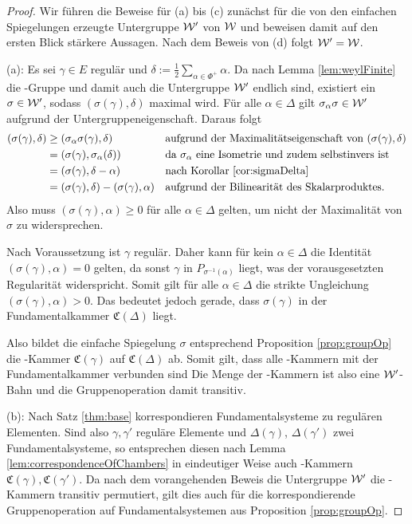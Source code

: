 \begin{proof}
  Wir führen die Beweise für (a) bis (c) zunächst für die von den einfachen Spiegelungen erzeugte Untergruppe $\mathcal{W}'$ von $\mathcal{W}$ und beweisen damit auf den ersten Blick stärkere Aussagen.
  Nach dem Beweis von (d) folgt $\mathcal{W}' = \mathcal{W}$.

  (a):
  Es sei $\gamma \in E$ regulär und $\delta := \tfrac{1}{2} \sum_{\alpha \in \Phi^+} \alpha$.
  Da nach Lemma \ref{lem:weylFinite} die \weyl\hyp{}Gruppe und damit auch die Untergruppe $\mathcal{W}'$ endlich sind, existiert ein $\sigma \in \mathcal{W}'$, sodass $(\sigma(\gamma), \delta)$ maximal wird.
  Für alle $\alpha \in \Delta$ gilt $\sigma_\alpha\sigma \in \mathcal{W}'$ aufgrund der Untergruppeneigenschaft.
  Daraus folgt
  \begin{align*}
    (\sigma(\gamma), \delta) 
    &\geq (\sigma_\alpha \sigma(\gamma), \delta) &&\text{aufgrund der Maximalitätseigenschaft von $(\sigma(\gamma),\delta)$} \\
    &= (\sigma(\gamma), \sigma_\alpha(\delta)) &&\text{da $\sigma_\alpha$ eine Isometrie und zudem selbstinvers ist} \\
    &= (\sigma(\gamma), \delta - \alpha) &&\text{nach Korollar \ref{cor:sigmaDelta}} \\
    &= (\sigma(\gamma), \delta) - (\sigma(\gamma), \alpha) &&\text{aufgrund der Bilinearität des Skalarproduktes.}
  \end{align*}
  Also muss $(\sigma(\gamma), \alpha) \geq 0$ für alle $\alpha \in \Delta$ gelten, um nicht der Maximalität von $\sigma$ zu widersprechen.

  Nach Voraussetzung ist $\gamma$ regulär.
  Daher kann für kein $\alpha \in \Delta$ die Identität $(\sigma(\gamma),\alpha) = 0$ gelten, da sonst $\gamma$ in $P_{\sigma^{-1}(\alpha)}$ liegt, was der vorausgesetzten Regularität widerspricht.
  Somit gilt für alle $\alpha \in \Delta$ die strikte Ungleichung $(\sigma(\gamma), \alpha) > 0$.
  Das bedeutet jedoch gerade, dass $\sigma(\gamma)$ in der Fundamentalkammer $\mathfrak{C}(\Delta)$ liegt.

  Also bildet die einfache Spiegelung $\sigma$ entsprechend Proposition \ref{prop:groupOp} die \weyl\hyp{}Kammer $\mathfrak{C}(\gamma)$ auf $\mathfrak{C}(\Delta)$ ab. 
  Somit gilt, dass alle \weyl\hyp{}Kammern mit der Fundamentalkammer verbunden sind
  Die Menge der \weyl\hyp{}Kammern ist also eine $\mathcal{W}'$\hyp{}Bahn und die Gruppenoperation damit transitiv.

  (b):
  Nach Satz \ref{thm:base} korrespondieren Fundamentalsysteme zu regulären Elementen.
  Sind also $\gamma, \gamma'$ reguläre Elemente und $\Delta(\gamma)$, $\Delta(\gamma')$ zwei Fundamentalsysteme, so entsprechen diesen nach Lemma \ref{lem:correspondenceOfChambers} in eindeutiger Weise auch \weyl\hyp{}Kammern $\mathfrak{C}(\gamma), \mathfrak{C}(\gamma')$.
  Da nach dem vorangehenden Beweis die Untergruppe $\mathcal{W}'$ die \weyl\hyp{}Kammern transitiv permutiert, gilt dies auch für die korrespondierende Gruppenoperation auf Fundamentalsystemen aus Proposition \ref{prop:groupOp}.
  

\end{proof}
